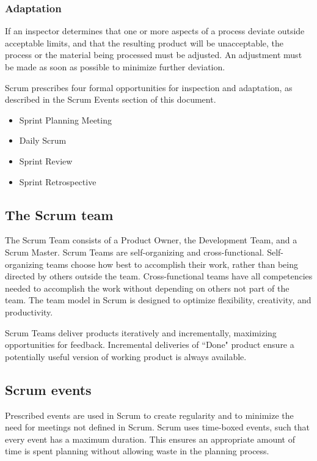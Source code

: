 \subsubsection{Adaptation}

If an inspector determines that one or more aspects of a process deviate outside acceptable limits, and that the resulting product will be unacceptable, the process or the material being processed must be adjusted. An adjustment must be made as soon as possible to minimize further deviation.

Scrum prescribes four formal opportunities for inspection and adaptation, as described in the Scrum Events section of this document.

\begin{itemize}
\item Sprint Planning Meeting
\item Daily Scrum 
\item Sprint Review
\item Sprint Retrospective
\end{itemize}

\subsection{The Scrum team}

The Scrum Team consists of a Product Owner, the Development Team, and a Scrum Master. Scrum Teams are self-organizing and cross-functional. Self-organizing teams choose how best to accomplish their work, rather than being directed by others outside the team. Cross-functional teams have all competencies needed to accomplish the work without depending on others not part of the team. The team model in Scrum is designed to optimize flexibility, creativity, and productivity.

Scrum Teams deliver products iteratively and incrementally, maximizing opportunities for feedback. Incremental deliveries of ``Done" product ensure a potentially useful version of 
working product is always available.

\subsection{Scrum events}

Prescribed events are used in Scrum to create regularity and to minimize the need for meetings not defined in Scrum. Scrum uses time-boxed events, such that every event has a maximum duration. This ensures an appropriate amount of time is spent planning without allowing waste in the planning process.


